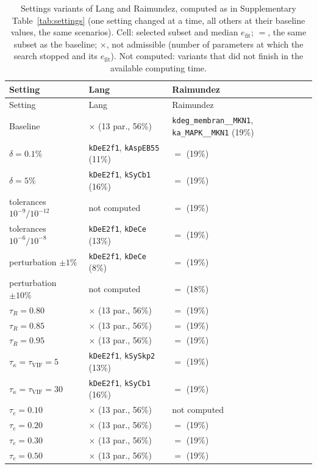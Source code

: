 \begin{longtable}{@{}>{\raggedright}p{3.2cm}>{\raggedright}p{6.2cm}>{\raggedright\arraybackslash}p{5.2cm}@{}}
\caption{Settings variants of Lang and Raimundez, computed as in Supplementary Table~\ref{tab:settings} (one setting changed at a time, all others at their baseline values, the same scenarios). Cell: selected subset and median $e_{\mathrm{fit}}$; $=$, the same subset as the baseline; $\times$, not admissible (number of parameters at which the search stopped and its $e_{\mathrm{fit}}$). Not computed: variants that did not finish in the available computing time.}\label{tab:settingsextra}\\
\toprule
Setting & Lang & Raimundez \\
\midrule
\endfirsthead
\toprule
Setting & Lang & Raimundez \\
\midrule
\endhead
Baseline & $\times$ (13 par., 56\%) & \texttt{kdeg\_membran\_\_MKN1}, \texttt{ka\_MAPK\_\_MKN1} (19\%) \\
$\delta=0.1\%$ & \texttt{kDeE2f1}, \texttt{kAspEB55} (11\%) & $=$ (19\%) \\
$\delta=5\%$ & \texttt{kDeE2f1}, \texttt{kSyCb1} (16\%) & $=$ (19\%) \\
tolerances $10^{-9}/10^{-12}$ & not computed & $=$ (19\%) \\
tolerances $10^{-6}/10^{-8}$ & \texttt{kDeE2f1}, \texttt{kDeCe} (13\%) & $=$ (19\%) \\
perturbation $\pm1\%$ & \texttt{kDeE2f1}, \texttt{kDeCe} (8\%) & $=$ (19\%) \\
perturbation $\pm10\%$ & not computed & $=$ (18\%) \\
$\tau_R=0.80$ & $\times$ (13 par., 56\%) & $=$ (19\%) \\
$\tau_R=0.85$ & $\times$ (13 par., 56\%) & $=$ (19\%) \\
$\tau_R=0.95$ & $\times$ (13 par., 56\%) & $=$ (19\%) \\
$\tau_\kappa=\tau_{\mathrm{VIF}}=5$ & \texttt{kDeE2f1}, \texttt{kSySkp2} (13\%) & $=$ (19\%) \\
$\tau_\kappa=\tau_{\mathrm{VIF}}=30$ & \texttt{kDeE2f1}, \texttt{kSyCb1} (16\%) & $=$ (19\%) \\
$\tau_e=0.10$ & $\times$ (13 par., 56\%) & not computed \\
$\tau_e=0.20$ & $\times$ (13 par., 56\%) & $=$ (19\%) \\
$\tau_e=0.30$ & $\times$ (13 par., 56\%) & $=$ (19\%) \\
$\tau_e=0.50$ & $\times$ (13 par., 56\%) & $=$ (19\%) \\
\bottomrule
\end{longtable}
